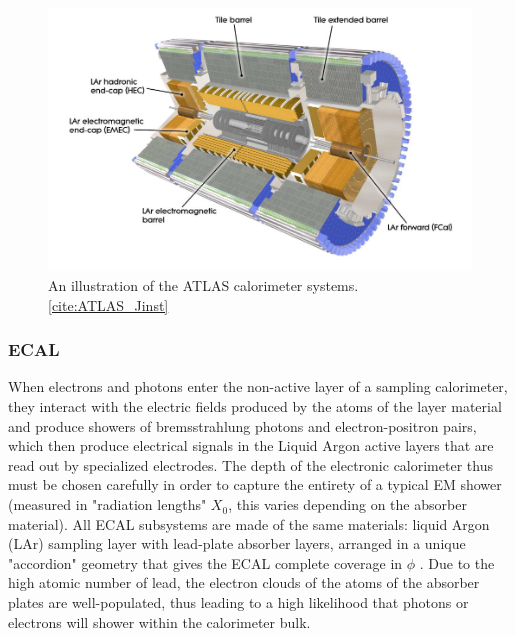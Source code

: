 \begin{figure}
  \includegraphics[width=\linewidth]{figures/detector_chapter/Calos.png}
  \caption{An illustration of the ATLAS calorimeter systems. \ref{cite:ATLAS_Jinst}}
  \label{fig:Calos}
\end{figure}


\subsubsection{ECAL} \label{sec:ECAL} 

When electrons and photons enter the non-active layer of a sampling calorimeter, they interact with the electric fields produced by the atoms of the layer material and produce showers of bremsstrahlung photons and electron-positron pairs, which then produce electrical signals in the Liquid Argon active layers that are read out by specialized electrodes. The depth of the electronic calorimeter thus must be chosen carefully in order to capture the entirety of a typical EM shower (measured in "radiation lengths" $X_0$, this varies depending on the absorber material). All ECAL subsystems are made of the same materials: liquid Argon (LAr) sampling layer with lead-plate absorber layers, arranged in a unique "accordion" geometry that gives the ECAL complete coverage in $\phi$ . Due to the high atomic number of lead, the electron clouds of the atoms of the absorber plates are well-populated, thus leading to a high likelihood that photons or electrons will shower within the calorimeter bulk.

